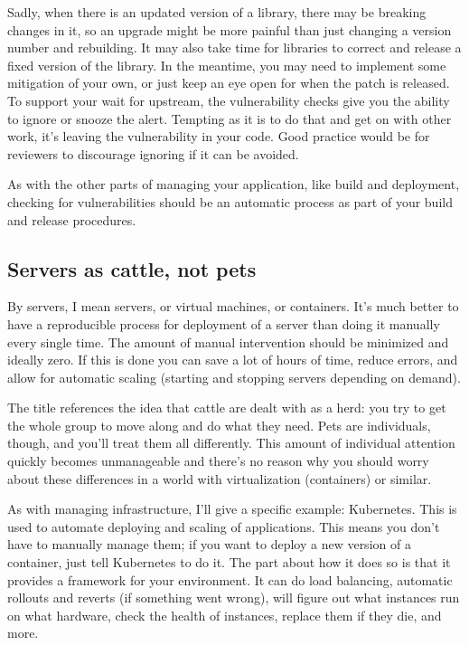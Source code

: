 \documentclass[a4paper]{report}
\begin{document}
Sadly, when there is an updated version of a library, there may be breaking changes in it, so an upgrade might be more painful than just changing a version number and rebuilding. It may also take time for libraries to correct and release a fixed version of the library. In the meantime, you may need to implement some mitigation of your own, or just keep an eye open for when the patch is released. To support your wait for upstream, the vulnerability checks give you the ability to ignore or snooze the alert. Tempting as it is to do that and get on with other work, it's leaving the vulnerability in your code. Good practice would be for reviewers to discourage ignoring if it can be avoided.

As with the other parts of managing your application, like build and deployment, checking for vulnerabilities should be an automatic process as part of your build and release procedures. 

\subsection*{Servers as cattle, not pets}
By servers, I mean servers, or virtual machines, or containers. It's much better to have a reproducible process for deployment of a server than doing it manually every single time. The amount of manual intervention should be minimized and ideally zero. If this is done you can save a lot of hours of time, reduce errors, and allow for automatic scaling (starting and stopping servers depending on demand).

The title references the idea that cattle are dealt with as a herd: you try to get the whole group to move along and do what they need. Pets are individuals, though, and you'll treat them all differently. This amount of individual attention quickly becomes unmanageable and there's no reason why you should worry about these differences in a world with virtualization (containers) or similar. 

As with managing infrastructure, I'll give a specific example: Kubernetes. This is used to automate deploying and scaling of applications. This means you don't have to manually manage them; if you want to deploy a new version of a container, just tell Kubernetes to do it. The part about how it does so is that it provides a framework for your environment. It can do load balancing, automatic rollouts and reverts (if something went wrong), will figure out what instances run on what hardware, check the health of instances, replace them if they die, and more.
\end{document}
